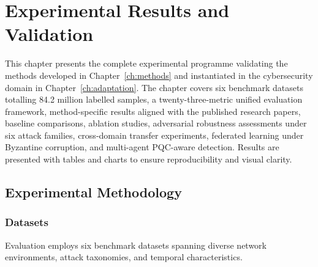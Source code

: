 
\chapter{Experimental Results and Validation}
\label{ch:experiments}

This chapter presents the complete experimental programme validating the methods developed in Chapter~\ref{ch:methods} and instantiated in the cybersecurity domain in Chapter~\ref{ch:adaptation}. The chapter covers six benchmark datasets totalling 84.2 million labelled samples, a twenty-three-metric unified evaluation framework, method-specific results aligned with the published research papers, baseline comparisons, ablation studies, adversarial robustness assessments under six attack families, cross-domain transfer experiments, federated learning under Byzantine corruption, and multi-agent PQC-aware detection. Results are presented with tables and charts to ensure reproducibility and visual clarity.


\section{Experimental Methodology}
\label{sec:exp_methodology}

\subsection{Datasets}

Evaluation employs six benchmark datasets spanning diverse network environments, attack taxonomies, and temporal characteristics.

